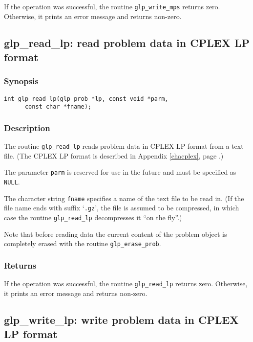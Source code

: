 If the operation was successful, the routine \verb|glp_write_mps|
returns zero. Otherwise, it prints an error message and returns
non-zero.

\subsection{glp\_read\_lp: read problem data in CPLEX LP format}

\subsubsection*{Synopsis}

\begin{verbatim}
int glp_read_lp(glp_prob *lp, const void *parm,
      const char *fname);
\end{verbatim}

\subsubsection*{Description}

The routine \verb|glp_read_lp| reads problem data in CPLEX LP format
from a text file. (The CPLEX LP format is described in Appendix
\ref{chacplex}, page \pageref{chacplex}.)

The parameter \verb|parm| is reserved for use in the future and must be
specified as \verb|NULL|.

The character string \verb|fname| specifies a name of the text file to
be read in. (If the file name ends with suffix `\verb|.gz|', the file is
assumed to be compressed, in which case the routine \verb|glp_read_lp|
decompresses it ``on the fly''.)

Note that before reading data the current content of the problem object
is completely erased with the routine \verb|glp_erase_prob|.

\subsubsection*{Returns}

If the operation was successful, the routine \verb|glp_read_lp| returns
zero. Otherwise, it prints an error message and returns non-zero.

\subsection{glp\_write\_lp: write problem data in CPLEX LP format}

